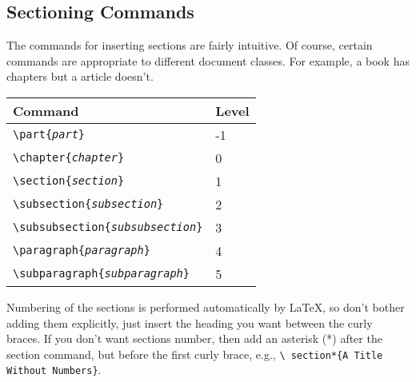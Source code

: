 \documentclass{article}
\begin{document}
\subsection{Sectioning Commands}
The commands for inserting sections are fairly intuitive.  Of course,
certain commands are appropriate to different document classes.
For example, a book has chapters but a article doesn't.

\begin{center}
	\begin{tabular}{| l | l |} 

		\hline  %
		Command & Level \\ \hline  %
		\texttt{\textbackslash part\{\emph{part}\}} & -1 \\
		\texttt{\textbackslash chapter\{\emph{chapter}\}} & 0 \\
		\texttt{\textbackslash section\{\emph{section}\}} & 1 \\
		\texttt{\textbackslash subsection\{\emph{subsection}\}} & 2 \\
		\texttt{\textbackslash subsubsection\{\emph{subsubsection}\}} & 3 \\
		\texttt{\textbackslash paragraph\{\emph{paragraph}\}} & 4 \\
		\texttt{\textbackslash subparagraph\{\emph{subparagraph}\}} & 5 \\
		\hline
	\end{tabular}
\end{center}

Numbering of the sections is performed automatically by \LaTeX{}, so don't
bother adding them explicitly, just insert the heading you want between
the curly braces.  If you don't want sections number, then add an asterisk (*) after the
section command, but before the first curly brace, e.g., \texttt{\textbackslash
section*\{A Title Without Numbers\}}.
\end{document}
